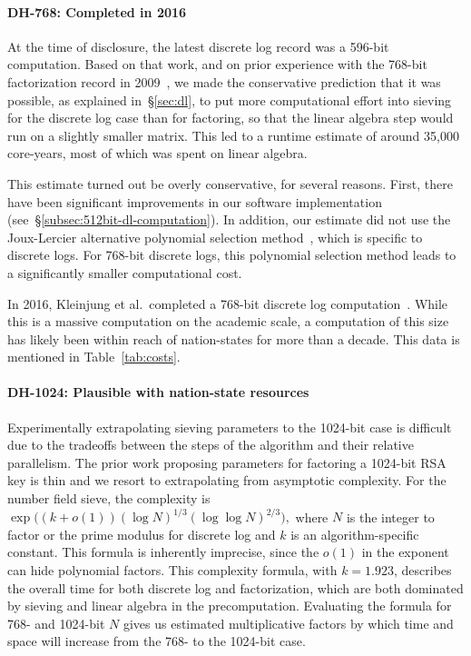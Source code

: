 \paragraph{DH-768: Completed in 2016}
At the time of disclosure, the latest discrete log record was a 596-bit
computation. Based on that work, and on prior experience with the 768-bit
factorization record in 2009~\cite{factor-rsa-768}, we made the conservative
prediction that it was possible, as explained in~\S\ref{sec:dl}, to put more
computational effort into sieving for the discrete log case than for
factoring, so that the linear algebra step would run on a slightly smaller
matrix. This led to a runtime estimate of around 35,000 core-years, most of
which was spent on linear algebra.

This estimate turned out be overly conservative, for several reasons. First,
there have been significant improvements in our software implementation
(see~\S\ref{subsec:512bit-dl-computation}). In addition, our estimate did not
use the Joux-Lercier alternative polynomial selection
method~\cite[\S2.1]{nfs-prime-field-2003}, which is specific to discrete
logs. For 768-bit discrete logs, this polynomial selection method leads to a
significantly smaller computational cost.

In 2016, Kleinjung et al.\ completed a 768-bit discrete log
computation~\cite{compute-dlog-768}. While this is a massive computation on
the academic scale, a computation of this size has likely been within reach
of nation-states for more than a decade. This data is mentioned in
Table~\ref{tab:costs}.

\paragraph{DH-1024: Plausible with nation-state resources}
Experimentally extrapolating sieving parameters to the 1024-bit case is
difficult due to the tradeoffs between the steps of the algorithm and their
relative parallelism. The prior work proposing parameters for factoring a
1024-bit RSA key is thin and we resort to extrapolating from asymptotic
complexity. For the number field sieve, the complexity is
$\exp\big((k+o(1))(\log N)^{1/3}(\log\log N)^{2/3}\big),$ where $N$ is the
integer to factor or the prime modulus for discrete log and $k$ is an
algorithm-specific constant. This formula is inherently imprecise, since the
$o(1)$ in the exponent can hide polynomial factors. This complexity formula,
with $k=1.923$, describes the overall time for both discrete log and
factorization, which are both dominated by sieving and linear algebra in the
precomputation. Evaluating the formula for 768- and 1024-bit $N$ gives us
estimated multiplicative factors by which time and space will increase from
the 768- to the 1024-bit case.

